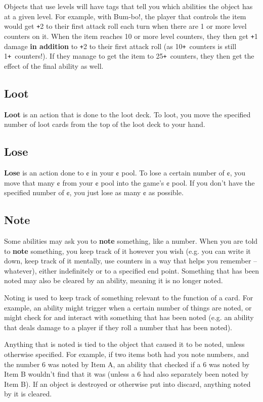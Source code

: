 \documentclass[10pt, a4paper, twoside]{article} %
\def\plus{\texttt{+}}
\begin{document}
    Objects that use levels will have tags that tell you which abilities the object has at a given level. For example, with Bum-bo!, the player that controls the item would get \plus2 to their first attack roll each turn when there are 1 or more level counters on it. When the item reaches 10 or more level counters, they then get \plus1 damage \textbf{in addition} to \plus2 to their first attack roll (as 10\plus\ counters is still 1\plus\ counters!). If they manage to get the item to 25\plus\ counters, they then get the effect of the final ability as well.
    \subsection{Loot}
    \textbf{Loot} is an action that is done to the loot deck. To loot, you move the specified number of loot cards from the top of the loot deck to your hand.
    \subsection{Lose}
    \textbf{Lose} is an action done to ¢ in your ¢ pool. To lose a certain number of ¢, you move that many ¢ from your ¢ pool into the game’s ¢ pool. If you don’t have the specified number of ¢, you just lose as many ¢ as possible.
    \subsection{Note}
    Some abilities may ask you to \textbf{note} something, like a number. When you are told to \textbf{note} something, you keep track of it however you wish (e.g. you can write it down, keep track of it mentally, use counters in a way that helps you remember – whatever), either indefinitely or to a specified end point. Something that has been noted may also be cleared by an ability, meaning it is no longer noted.

    Noting is used to keep track of something relevant to the function of a card. For example, an ability might trigger when a certain number of things are noted, or might check for and interact with something that has been noted (e.g. an ability that deals damage to a player if they roll a number that has been noted).

    Anything that is noted is tied to the object that caused it to be noted, unless otherwise specified. For example, if two items both had you note numbers, and the number 6 was noted by Item A, an ability that checked if a 6 was noted by Item B wouldn’t find that it was (unless a 6 had also separately been noted by Item B). If an object is destroyed or otherwise put into discard, anything noted by it is cleared.
\end{document}
